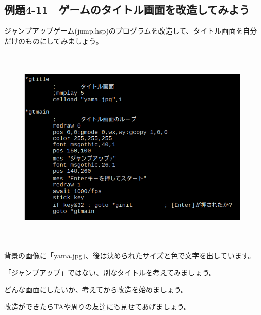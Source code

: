 \newpage
\subsection{例題4-11　ゲームのタイトル画面を改造してみよう}


\begin{description}
    \item {}
\end{description}


ジャンプアップゲーム(jump.hsp)のプログラムを改造して、タイトル画面を自分だけのものにしてみましょう。

\begin{figure}[H]
    \begin{center}
      \includegraphics[keepaspectratio,width=14.42cm,height=9.791cm]{text04-img/text04-img033.png}
    \end{center}
    \label{fig:prog_menu}
\end{figure}


\begin{description}
    \item {}
\end{description}

背景の画像に「yama.jpg」、後は決められたサイズと色で文字を出しています。

「ジャンプアップ」ではない、別なタイトルを考えてみましょう。

どんな画面にしたいか、考えてから改造を始めましょう。

改造ができたらTAや周りの友達にも見せてあげましょう。




